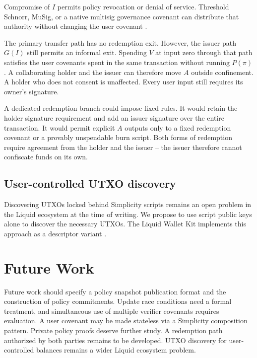 \documentclass[11pt]{article}
\begin{document}
    Compromise of $I$ permits policy revocation or denial of service.
    Threshold Schnorr, MuSig, or a native multisig governance covenant can distribute that authority without changing the user covenant \cite{programmable-signatures}.

    The primary transfer path has no redemption exit.
    However, the issuer path $G(I)$ still permits an informal exit.
    Spending $V$ at input zero through that path satisfies the user covenants spent in the same transaction without running $P(\pi)$.
    A collaborating holder and the issuer can therefore move $A$ outside confinement.
    A holder who does not consent is unaffected.
    Every user input still requires its owner's signature.

    A dedicated redemption branch could impose fixed rules.
    It would retain the holder signature requirement and add an issuer signature over the entire transaction.
    It would permit explicit $A$ outputs only to a fixed redemption covenant or a provably unspendable burn script.
    Both forms of redemption require agreement from the holder and the issuer -- the issuer therefore cannot confiscate funds on its own.

    \subsection{User-controlled UTXO discovery}

    Discovering UTXOs locked behind Simplicity scripts remains an open problem in the Liquid ecosystem at the time of writing.
    We propose to use script public keys alone to discover the necessary UTXOs.
    The Liquid Wallet Kit implements this approach as a descriptor variant \cite{lwk-spk-descriptor}.


    \section{Future Work}

    Future work should specify a policy snapshot publication format and the construction of policy commitments.
    Update race conditions need a formal treatment, and simultaneous use of multiple verifier covenants requires evaluation.
    A user covenant may be made stateless via a Simplicity composition pattern.
    Private policy proofs deserve further study.
    A redemption path authorized by both parties remains to be developed.
    UTXO discovery for user-controlled balances remains a wider Liquid ecosystem problem.
\end{document}
